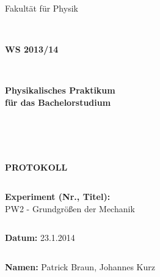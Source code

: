 \documentclass[12pt,a4paper]{article}
\begin{document}
\thispagestyle{empty}
			\begin{center}
			\Large{Fakultät für Physik}\\
			\end{center}
\begin{verbatim}


\end{verbatim}
			\begin{center}
			\textbf{\LARGE WS 2013/14}
			\end{center}
\begin{verbatim}


\end{verbatim}
			\begin{center}
			\textbf{\LARGE{Physikalisches Praktikum\\ für das Bachelorstudium}}
			\end{center}
\begin{verbatim}




\end{verbatim}

			\begin{center}
			\textbf{\LARGE{PROTOKOLL}}
			\end{center}
			
\begin{verbatim}

\end{verbatim}

			\begin{flushleft}
			\textbf{\Large{Experiment (Nr., Titel):}}\\
			\LARGE{PW2 - Grundgrößen der Mechanik}	
			\end{flushleft}

\begin{verbatim}

\end{verbatim}	
			\begin{flushleft}
			\textbf{\Large{Datum:}} \Large{23.1.2014}
			\end{flushleft}
			
\begin{verbatim}
\end{verbatim}
		\begin{flushleft}
			\textbf{\Large{Namen:}} \Large{Patrick Braun, Johannes Kurz}
			\end{flushleft}
\end{document}
